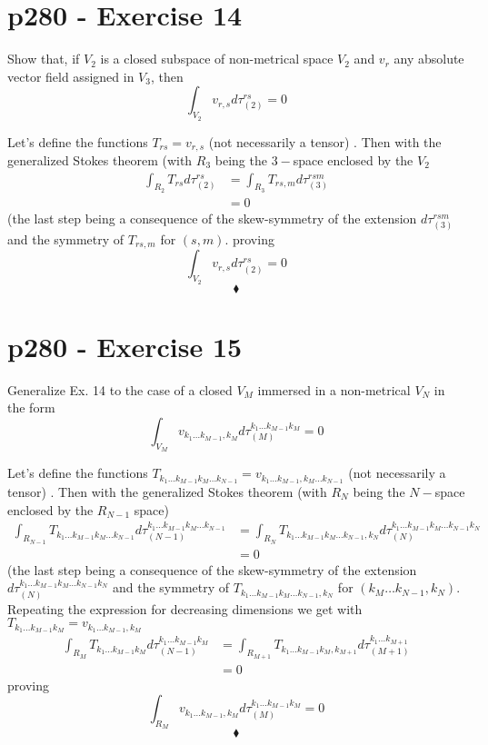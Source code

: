 \section{p280 - Exercise 14}
\begin{tcolorbox}
Show that, if $V_2$ is a closed subspace of non-metrical space $V_2$ and $v_r$ any absolute vector field assigned in $V_3$, then 
$$\int_{V_2} v_{r,s}d\tau_{(2)}^{rs}=0$$
\end{tcolorbox}
Let's define the functions $T_{rs}= v_{r,s}$ (not necessarily a tensor) . Then with the generalized Stokes theorem (with $R_3$ being the $3-$space enclosed  by the $V_2$
\begin{align}
\int_{R_2} T_{rs}d\tau_{(2)}^{rs} &=\int_{R_3} T_{rs,m}d\tau_{(3)}^{rsm}  \\
&=0
\end{align}
(the last step being a consequence of the skew-symmetry of the extension $d\tau_{(3)}^{rsm}$ and the symmetry of $T_{rs,m}$ for $(s,m)$.
proving $$\int_{V_2} v_{r,s}d\tau_{(2)}^{rs}=0$$
$$\blacklozenge$$
\newpage

\section{p280 - Exercise 15}
\begin{tcolorbox}
Generalize Ex. 14 to the case of a closed $V_M$ immersed in a non-metrical $V_N$ in the form  
$$\int_{V_M} v_{k_1\dots k_{M-1},k_M}d\tau_{(M)}^{k_1\dots k_{M-1}k_{M}}=0$$
\end{tcolorbox}
Let's define the functions $T_{k_1\dots k_{M-1}k_M \dots k_{N-1} }= v_{k_1\dots k_{M-1},k_M \dots k_{N-1} }$ (not necessarily a tensor) . Then with the generalized Stokes theorem (with $R_N$ being the $N-$space enclosed  by the $R_{N-1}$ space)
\begin{align}
\int_{R_{N-1}} T_{k_1\dots k_{M-1}k_M \dots k_{N-1}}d\tau_{(N-1)}^{k_1\dots k_{M-1}k_M \dots k_{N-1}} &=\int_{R_{N}} T_{k_1\dots k_{M-1}k_M \dots k_{N-1},k_N }d\tau_{(N)}^{k_1\dots k_{M-1}k_M \dots k_{N-1}k_N }  \\
&=0
\end{align}
(the last step being a consequence of the skew-symmetry of the extension $d\tau_{(N)}^{k_1\dots k_{M-1}k_M \dots k_{N-1}k_N } $ and the symmetry of $T_{k_1\dots k_{M-1}k_M \dots k_{N-1},k_N }$ for $(k_M \dots k_{N-1},k_N )$.
Repeating the expression for decreasing dimensions we get with 
$T_{k_1\dots k_{M-1}k_M  }= v_{k_1\dots k_{M-1},k_M  }$ 
\begin{align}
\int_{R_{M}} T_{k_1\dots k_{M-1}k_M }d\tau_{(N-1)}^{k_1\dots k_{M-1}k_M } &=\int_{R_{M+1}} T_{k_1\dots k_{M-1}k_M ,k_{M+1} }d\tau_{(M+1)}^{k_1\dots k_{M+1}}  \\
&=0
\end{align}
proving $$\int_{R_{M}}  v_{k_1\dots k_{M-1},k_M  }d\tau_{(M)}^{k_1\dots k_{M-1}k_M }=0$$
$$\blacklozenge$$
\newpage

